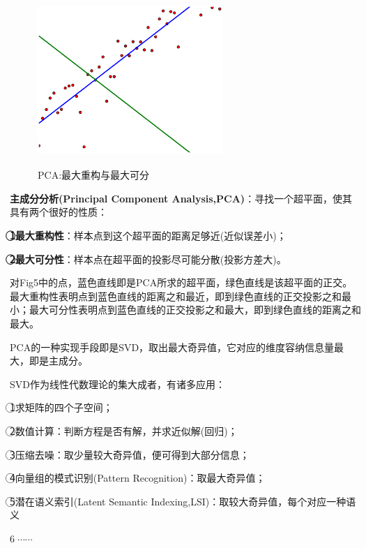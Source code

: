 \documentclass{article}
\begin{document}
\begin{CJK}{UTF8}{gbsn}
\begin{figure}[H]
\centering
\includegraphics[height=6.5cm,width=7cm]{fig6.eps}
\caption{PCA:最大重构与最大可分}
\label{6}
\end{figure}

	\textbf{主成分分析(Principal Component Analysis,PCA)}：寻找一个超平面，使其具有两个很好的性质：\par
	\textbf{\textcircled{1}最大重构性}：样本点到这个超平面的距离足够近(近似误差小)；\par
	\textbf{\textcircled{2}最大可分性}：样本点在超平面的投影尽可能分散(投影方差大)。\par
	对Fig5中的点，蓝色直线即是PCA所求的超平面，绿色直线是该超平面的正交。最大重构性表明点到蓝色直线的距离之和最近，即到绿色直线的正交投影之和最小；最大可分性表明点到蓝色直线的正交投影之和最大，即到绿色直线的距离之和最大。\par
	PCA的一种实现手段即是SVD，取出最大奇异值，它对应的维度容纳信息量最大，即是主成分。\par
	SVD作为线性代数理论的集大成者，有诸多应用：\par
	\textcircled{1}求矩阵的四个子空间；\par
	\textcircled{2}数值计算：判断方程是否有解，并求近似解(回归)；\par
	\textcircled{3}压缩去噪：取少量较大奇异值，便可得到大部分信息；\par
	\textcircled{4}向量组的模式识别(Pattern Recognition)：取最大奇异值；\par
	\textcircled{5}潜在语义索引(Latent Semantic Indexing,LSI)：取较大奇异值，每个对应一种语义\par
	\textcircled{6}$\cdots\cdots$
	
	
	
	
\end{CJK}
\end{document}
